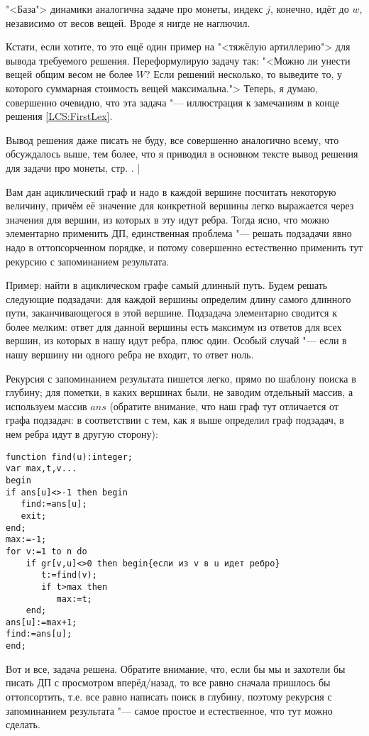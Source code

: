 "<База"> динамики аналогична задаче про монеты, индекс $j$, конечно, идёт до $w$, независимо от 
весов вещей. Вроде я нигде не наглючил.

Кстати, если хотите, то это ещё один пример на "<тяжёлую артиллерию"> для вывода требуемого 
решения. Переформулирую задачу так: "<Можно ли унести вещей общим весом не более $W$? Если решений 
несколько, то выведите то, у которого суммарная стоимость вещей максимальна."> Теперь, я думаю, 
совершенно очевидно, что эта задача "--- иллюстрация к замечаниям в конце решения 
\ref{LCS:FirstLex}.

Вывод решения даже писать не буду, все совершенно аналогично всему, что обсуждалось выше, тем 
более, что я приводил в основном тексте вывод решения для задачи про монеты, стр. \pageref{coins_out}.
|

 Вам дан ациклический граф и надо в каждой вершине посчитать
некоторую величину, причём её значение для конкретной вершины легко выражается через значения для
вершин, из которых в эту идут ребра. Тогда ясно, что можно элементарно применить ДП, единственная
проблема "--- решать подзадачи явно надо в оттопсорченном порядке, и потому совершенно естественно
применить тут рекурсию с запоминанием результата.

Пример: найти в ациклическом графе самый длинный путь. Будем решать следующие подзадачи: для каждой
вершины определим длину самого длинного пути, заканчивающегося в этой вершине. Подзадача элементарно
сводится к более мелким: ответ для данной вершины есть максимум из ответов для всех вершин, из
которых в нашу идут ребра, плюс один. Особый случай "--- если в нашу вершину ни одного ребра не
входит, то ответ ноль.

Рекурсия с запоминанием результата пишется легко, прямо по шаблону поиска в глубину; для пометки, в
каких вершинах были, не заводим отдельный массив, а используем массив $ans$ (обратите внимание, что наш граф тут отличается от графа подзадач: в соответствии с тем, как я выше определил граф подзадач, в нем ребра идут в другую сторону):

\begin{codesampleo}\begin{verbatim}
function find(u):integer;
var max,t,v...
begin
if ans[u]<>-1 then begin
   find:=ans[u];
   exit;
end;
max:=-1;
for v:=1 to n do
    if gr[v,u]<>0 then begin{если из v в u идет ребро}
       t:=find(v);
       if t>max then
          max:=t;
    end;
ans[u]:=max+1;
find:=ans[u];
end;
\end{verbatim}\end{codesampleo}
Вот и все, задача решена. Обратите внимание, что, если бы мы и захотели бы писать ДП с просмотром
вперёд/назад, то все равно сначала пришлось бы оттопсортить, т.е. все равно написать поиск в
глубину, поэтому рекурсия с запоминанием результата "--- самое простое и естественное, что тут можно
сделать.

